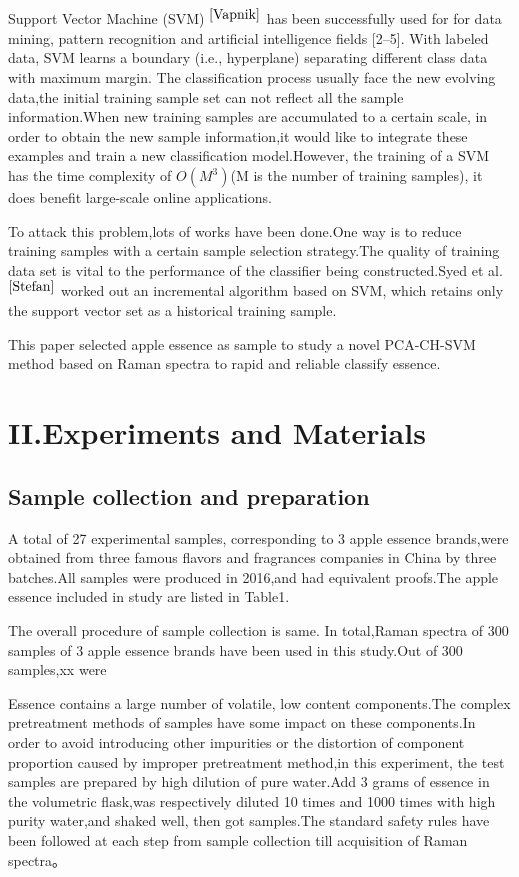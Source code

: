 \documentclass[a4paper]{article}
\begin{document}
Support Vector Machine (SVM) $^{\cite{Vapnik}}$ has been successfully used for for data mining, pattern recognition and artiﬁcial intelligence ﬁelds [2–5]. With labeled data, SVM learns a boundary (i.e., hyperplane) separating different class data with maximum margin.
The classification process usually face the new evolving data,the initial training sample set can not reflect all the sample information.When new training samples are accumulated to a certain scale, in order to obtain the new sample information,it would like to integrate these examples and train a new classification model.However, the training of a SVM has the time complexity of $O(M^3)$(M is the number of training samples), it does benefit large-scale online applications.

To attack this problem,lots of works have been done.One way is to reduce training samples with a certain sample selection strategy.The quality of training data set is vital to the performance of the classifier being constructed.Syed et al.$ ^{\cite{Stefan}}$ worked out an incremental algorithm based on SVM, which retains only the support vector set as a historical training sample.

This paper selected apple essence as sample to study a novel PCA-CH-SVM method based on Raman spectra to rapid and reliable classify essence.
\section{II.Experiments and Materials}
\subsection{Sample collection and preparation}
A total of 27 experimental samples, corresponding to 3 apple essence brands,were obtained from three famous flavors and fragrances companies in China by three batches.All samples were produced in 2016,and had equivalent proofs.The apple essence included in study are listed in Table1.

The overall procedure of sample collection is same. In total,Raman spectra of 300 samples of 3 apple essence brands have been used in this study.Out of 300 samples,xx were

Essence contains a large number of volatile, low content components.The complex pretreatment methods of samples have some impact on these components.In order to avoid introducing other impurities or the distortion of component proportion caused by improper pretreatment method,in this experiment, the test samples are prepared by high dilution of pure water.Add 3 grams of essence in the volumetric flask,was respectively diluted 10 times and 1000 times with high purity water,and  shaked well, then got samples.The  standard  safety  rules  have  been  followed  at  each step from sample collection till acquisition of Raman spectra。
\end{document}
